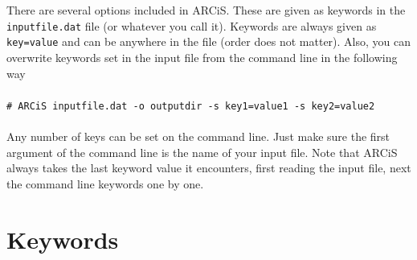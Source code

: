 \documentclass[12pt]{article}
\newcommand{\shellcmd}[1]{\\ \\ \indent\indent\texttt{\# #1}\\ \\ }
\begin{document}
There are several options included in ARCiS. These are given as keywords in the \texttt{inputfile.dat} file (or whatever you call it). Keywords are always given as \texttt{key=value} and can be anywhere in the file (order does not matter). Also, you can overwrite keywords set in the input file from the command line in the following way
%
\shellcmd{ARCiS inputfile.dat -o outputdir -s key1=value1 -s key2=value2}
%
Any number of keys can be set on the command line. Just make sure the first argument of the command line is the name of your input file. Note that ARCiS always takes the last keyword value it encounters, first reading the input file, next the command line keywords one by one.

\section{Keywords}
\end{document}
